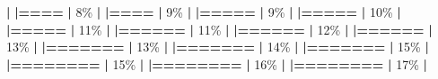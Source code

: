 \documentclass[
]{book}
\newenvironment{Shaded}{\begin{snugshade}}{\end{snugshade}}
\newcommand{\DecValTok}[1]{\textcolor[rgb]{0.00,0.00,0.81}{#1}}
\newcommand{\ErrorTok}[1]{\textcolor[rgb]{0.64,0.00,0.00}{\textbf{#1}}}
\newcommand{\NormalTok}[1]{#1}
\newcommand{\SpecialCharTok}[1]{\textcolor[rgb]{0.81,0.36,0.00}{\textbf{#1}}}
\begin{document}
\begin{Shaded}
\begin{Highlighting}[]
  \SpecialCharTok{|}                                                        
  \ErrorTok{|====}                                              \ErrorTok{|}   \DecValTok{8}\NormalTok{\%}
  \SpecialCharTok{|}                                                        
  \ErrorTok{|====}                                              \ErrorTok{|}   \DecValTok{9}\NormalTok{\%}
  \SpecialCharTok{|}                                                        
  \ErrorTok{|=====}                                             \ErrorTok{|}   \DecValTok{9}\NormalTok{\%}
  \SpecialCharTok{|}                                                        
  \ErrorTok{|=====}                                             \ErrorTok{|}  \DecValTok{10}\NormalTok{\%}
  \SpecialCharTok{|}                                                        
  \ErrorTok{|=====}                                             \ErrorTok{|}  \DecValTok{11}\NormalTok{\%}
  \SpecialCharTok{|}                                                        
  \ErrorTok{|======}                                            \ErrorTok{|}  \DecValTok{11}\NormalTok{\%}
  \SpecialCharTok{|}                                                        
  \ErrorTok{|======}                                            \ErrorTok{|}  \DecValTok{12}\NormalTok{\%}
  \SpecialCharTok{|}                                                        
  \ErrorTok{|======}                                            \ErrorTok{|}  \DecValTok{13}\NormalTok{\%}
  \SpecialCharTok{|}                                                        
  \ErrorTok{|=======}                                           \ErrorTok{|}  \DecValTok{13}\NormalTok{\%}
  \SpecialCharTok{|}                                                        
  \ErrorTok{|=======}                                           \ErrorTok{|}  \DecValTok{14}\NormalTok{\%}
  \SpecialCharTok{|}                                                        
  \ErrorTok{|=======}                                           \ErrorTok{|}  \DecValTok{15}\NormalTok{\%}
  \SpecialCharTok{|}                                                        
  \ErrorTok{|========}                                          \ErrorTok{|}  \DecValTok{15}\NormalTok{\%}
  \SpecialCharTok{|}                                                        
  \ErrorTok{|========}                                          \ErrorTok{|}  \DecValTok{16}\NormalTok{\%}
  \SpecialCharTok{|}                                                        
  \ErrorTok{|========}                                          \ErrorTok{|}  \DecValTok{17}\NormalTok{\%}
  \SpecialCharTok{|}                                                        

\end{Highlighting}
\end{Shaded}
\end{document}
